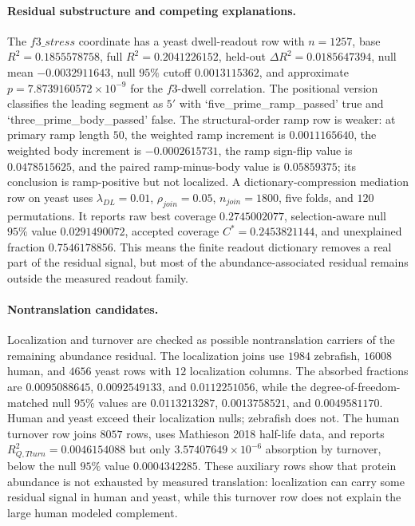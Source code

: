 \paragraph{Residual substructure and competing explanations.}
The $f3\_stress$ coordinate has a yeast dwell-readout row with $n=1257$, base $R^{2}=0.1855578758$, full $R^{2}=0.2041226152$, held-out $\Delta R^{2}=0.0185647394$, null mean $-0.0032911643$, null $95\%$ cutoff $0.0013115362$, and approximate $p=7.8739160572\times 10^{-9}$ for the $f3$-dwell correlation.  The positional version classifies the leading segment as $5'$ with `five\_prime\_ramp\_passed' true and `three\_prime\_body\_passed' false.  The structural-order ramp row is weaker: at primary ramp length $50$, the weighted ramp increment is $0.0011165640$, the weighted body increment is $-0.0002615731$, the ramp sign-flip value is $0.0478515625$, and the paired ramp-minus-body value is $0.05859375$; its conclusion is ramp-positive but not localized.  A dictionary-compression mediation row on yeast uses $\lambda_{DL}=0.01$, $\rho_{join}=0.05$, $n_{join}=1800$, five folds, and $120$ permutations.  It reports raw best coverage $0.2745002077$, selection-aware null $95\%$ value $0.0291490072$, accepted coverage $C^{*}=0.2453821144$, and unexplained fraction $0.7546178856$.  This means the finite readout dictionary removes a real part of the residual signal, but most of the abundance-associated residual remains outside the measured readout family.

\paragraph{Nontranslation candidates.}
Localization and turnover are checked as possible nontranslation carriers of the remaining abundance residual.  The localization joins use $1984$ zebrafish, $16008$ human, and $4656$ yeast rows with $12$ localization columns.  The absorbed fractions are $0.0095088645$, $0.0092549133$, and $0.0112251056$, while the degree-of-freedom-matched null $95\%$ values are $0.0113213287$, $0.0013758521$, and $0.0049581170$.  Human and yeast exceed their localization nulls; zebrafish does not.  The human turnover row joins $8057$ rows, uses Mathieson 2018 half-life data, and reports $R^{2}_{Q,Tturn}=0.0046154088$ but only $3.57407649\times 10^{-6}$ absorption by turnover, below the null $95\%$ value $0.0004342285$.  These auxiliary rows show that protein abundance is not exhausted by measured translation: localization can carry some residual signal in human and yeast, while this turnover row does not explain the large human modeled complement.

